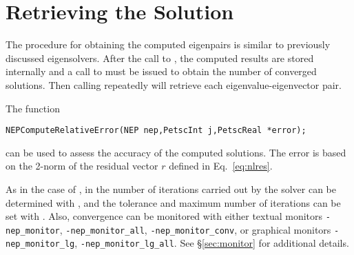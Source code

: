 \section{Retrieving the Solution}

The procedure for obtaining the computed eigenpairs is similar to previously discussed eigensolvers. After the call to , the computed results are stored internally and a call to  must be issued to obtain the number of converged solutions. Then calling  repeatedly will retrieve each eigenvalue-eigenvector pair.

The function
	\begin{Verbatim}[fontsize=\small]
	NEPComputeRelativeError(NEP nep,PetscInt j,PetscReal *error);
	\end{Verbatim}
can be used to assess the accuracy of the computed solutions. The error is based on the 2-norm of the residual vector $r$ defined in Eq.\ \ref{eq:nlres}.

As in the case of , in  the number of iterations carried out by the solver can be determined with , and the tolerance and maximum number of iterations can be set with . Also, convergence can be monitored with either textual monitors \Verb!-nep_monitor!, \Verb!-nep_monitor_all!, \Verb!-nep_monitor_conv!, or graphical monitors \Verb!-nep_monitor_lg!, \Verb!-nep_monitor_lg_all!. See \S\ref{sec:monitor} for additional details.

